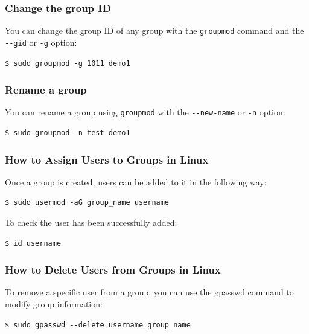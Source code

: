 \documentclass{article}
\newenvironment{codetemplate}[1][]{%
  \mybasecolorbox[#1]
  \itshape
}{%
  \endmybasecolorbox
}
\begin{document}
\subsubsection{Change the group ID}
You can change the group ID of any group with the \verb|groupmod| command and the \verb|--gid| or \verb|-g| option:
\begin{codetemplate}{}
\begin{verbatim}
$ sudo groupmod -g 1011 demo1
\end{verbatim}
\end{codetemplate}

\subsubsection{Rename a group}
You can rename a group using \verb|groupmod| with the \verb|--new-name| or \verb|-n| option:
\begin{codetemplate}{}
\begin{verbatim}
$ sudo groupmod -n test demo1
\end{verbatim}
\end{codetemplate}

\subsubsection{How to Assign Users to Groups in Linux}

Once a group is created, users can be added to it in the following way:
\begin{codetemplate}{}
\begin{verbatim}
$ sudo usermod -aG group_name username
\end{verbatim}
\end{codetemplate}

To check the user has been successfully added:
\begin{codetemplate}{}
\begin{verbatim}
$ id username
\end{verbatim}
\end{codetemplate}

\subsubsection{How to Delete Users from Groups in Linux}
To remove a specific user from a group, you can use the gpasswd command to modify group information:
\begin{codetemplate}{}
\begin{verbatim}
$ sudo gpasswd --delete username group_name
\end{verbatim}
\end{codetemplate}
\end{document}
